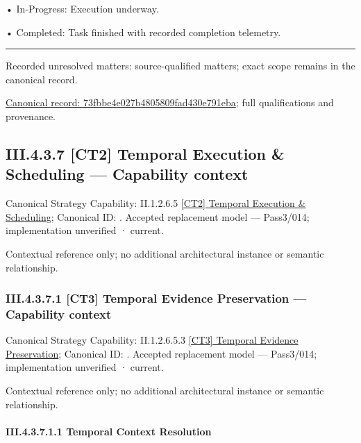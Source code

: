 •
In-Progress: Execution underway.



•
Completed: Task finished with recorded completion telemetry.



\medskip\hrule\medskip

{\small Recorded unresolved matters: source-qualified matters; exact scope remains in the canonical record.}\par
{\footnotesize \href{../../../../../../../../continuum/business/business-process/73fbbe4e027b4805809fad430e791eba.md}{Canonical record: 73fbbe4e027b4805809fad430e791eba}; full qualifications and provenance.}\par
\subsection*{III.4.3.7 [CT2] Temporal Execution \& Scheduling — Capability context}
\label{navigation:III.4.3.7}

{\small Canonical Strategy Capability: II.1.2.6.5 \hyperref[element:6057f63cf19f4bdaadaf35b1f44665c6]{[CT2] Temporal Execution \& Scheduling}; Canonical ID: \texttt{}. Accepted replacement model — Pass3/014; implementation unverified · current.}\par
Contextual reference only; no additional architectural instance or semantic relationship.\par
\subsubsection*{III.4.3.7.1 [CT3] Temporal Evidence Preservation — Capability context}
\label{navigation:III.4.3.7.1}

{\small Canonical Strategy Capability: II.1.2.6.5.3 \hyperref[element:c514788f09de4f1dabc4f800ca585faa]{[CT3] Temporal Evidence Preservation}; Canonical ID: \texttt{}. Accepted replacement model — Pass3/014; implementation unverified · current.}\par
Contextual reference only; no additional architectural instance or semantic relationship.\par
\paragraph*{III.4.3.7.1.1 Temporal Context Resolution}
\label{navigation:III.4.3.7.1.1}

